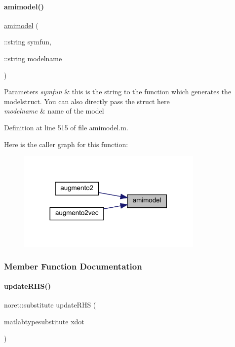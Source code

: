 \paragraph{\texorpdfstring{amimodel()}{amimodel()}}
{\footnotesize\ttfamily \mbox{\hyperlink{classamimodel}{amimodel}} (\begin{DoxyParamCaption}\item[{\+::string}]{symfun,  }\item[{\+::string}]{modelname }\end{DoxyParamCaption})}


\begin{DoxyParams}{Parameters}
{\em symfun} & this is the string to the function which generates the modelstruct. You can also directly pass the struct here \\
\hline
{\em modelname} & name of the model \\
\hline
\end{DoxyParams}


Definition at line 515 of file amimodel.\+m.

Here is the caller graph for this function\+:
\nopagebreak
\begin{figure}[H]
\begin{center}
\leavevmode
\includegraphics[width=257pt]{classamimodel_a05d52506788717b3d482845748446a60_icgraph}
\end{center}
\end{figure}


\subsubsection{Member Function Documentation}
\mbox{\label{classamimodel_aa508c0cd4ac026e464f85cec25678850}} 
\paragraph{\texorpdfstring{updateRHS()}{updateRHS()}}
{\footnotesize\ttfamily noret\+::substitute update\+R\+HS (\begin{DoxyParamCaption}\item[{matlabtypesubstitute}]{xdot }\end{DoxyParamCaption})}


